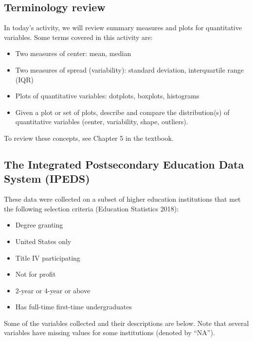 \documentclass[
]{report}
\begin{document}
\subsection{Terminology review}\label{terminology-review-8}

In today's activity, we will review summary measures and plots for quantitative variables. Some terms covered in this activity are:

\begin{itemize}
\item
  Two measures of center: mean, median
\item
  Two measures of spread (variability): standard deviation, interquartile range (IQR)
\item
  Plots of quantitative variables: dotplots, boxplots, histograms
\item
  Given a plot or set of plots, describe and compare the distribution(s)
  of quantitative variables
  (center, variability, shape, outliers).
\end{itemize}

To review these concepts, see Chapter 5 in the textbook.

\subsection{The Integrated Postsecondary Education Data System (IPEDS)}\label{the-integrated-postsecondary-education-data-system-ipeds}

These data were collected on a subset of higher education institutions that met the following selection criteria (Education Statistics 2018):

\begin{itemize}
\item
  Degree granting
\item
  United States only
\item
  Title IV participating
\item
  Not for profit
\item
  2-year or 4-year or above
\item
  Has full-time first-time undergraduates
\end{itemize}

Some of the variables collected and their descriptions are below. Note that several variables have missing values for some institutions (denoted by ``NA'').
\end{document}
